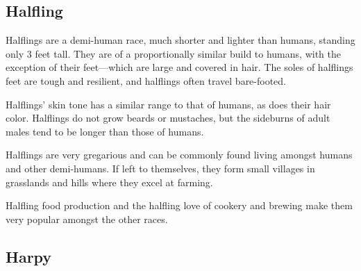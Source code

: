\begin{multicols*}{2}
\subsection{Halfling}

Halflings are a demi-human race, much shorter and lighter than humans, standing only 3 feet tall. They are of a proportionally similar build to humans, with the exception of their feet—which are large and covered in hair. The soles of halflings feet are tough and resilient, and halflings often travel bare-footed.

Halflings’ skin tone has a similar range to that of humans, as does their hair color. Halflings do not grow beards or mustaches, but the sideburns of adult males tend to be longer than those of humans.

Halflings are very gregarious and can be commonly found living amongst humans and other demi-humans. If left to themselves, they form small villages in grasslands and hills where they excel at farming.

Halfling food production and the halfling love of cookery and brewing make them very popular amongst the other races.

\subsection{Harpy}
\end{multicols*}
